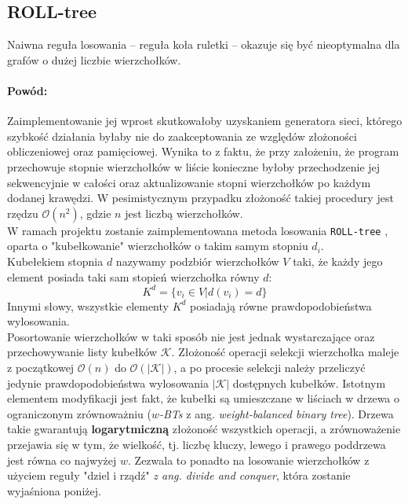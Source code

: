 \documentclass{article}
\begin{document}
	\subsection{ROLL-tree}
	Naiwna reguła losowania -- reguła koła ruletki -- okazuje się być nieoptymalna dla grafów o dużej liczbie wierzchołków.
	\paragraph{Powód:\\}
	Zaimplementowanie jej wprost skutkowałoby uzyskaniem generatora sieci, którego szybkość działania byłaby nie do zaakceptowania ze względów złożoności obliczeniowej oraz pamięciowej. Wynika to z faktu, że przy założeniu, że program przechowuje stopnie wierzchołków w liście konieczne byłoby przechodzenie jej sekwencyjnie w całości oraz aktualizowanie stopni wierzchołków po każdym dodanej krawędzi. W pesimistycznym przypadku złożoność takiej procedury jest rzędzu $\mathcal{O}(n^2)$, gdzie $n$ jest liczbą wierzchołków.\\
	\newline
	W ramach projektu zostanie zaimplementowana metoda losowania \texttt{ROLL-tree} \cite{rolltree}, oparta o "kubełkowanie" wierzchołków o takim samym stopniu $d_i$.\\ 
	Kubełekiem stopnia $d$ nazywamy podzbiór wierzchołków $V$ taki, że każdy jego element posiada taki sam stopień wierzchołka równy $d$:
	\begin{equation}
		K^{d} = \{v_i \in V | d(v_{i}) = d\}
	\end{equation}
	Innymi słowy, wszystkie elementy $K^{d}$ posiadają równe prawdopodobieństwa wylosowania. \\
	Posortowanie wierzchołków w taki sposób nie jest jednak wystarczające
	oraz przechowywanie listy kubełków $\mathcal{K}$. Złożoność operacji selekcji wierzchołka maleje z początkowej $\mathcal{O}(n)$ do $\mathcal{O}(|\mathcal{K}|)$, a po procesie selekcji należy przeliczyć jedynie prawdopodobieństwa wylosowania $|\mathcal{K}|$ dostępnych kubełków.
	Istotnym elementem modyfikacji jest fakt, że
	kubełki są umieszczane w liściach w drzewa o ograniczonym zrównoważniu (\textit{$w$-BTs} z ang. \textit{weight-balanced binary tree}). Drzewa takie gwarantują \textbf{logarytmiczną} złożoność wszystkich operacji, a zrównoważenie
	przejawia się w tym, że wielkość, tj. liczbę kluczy, lewego i prawego poddrzewa jest równa co najwyżej $w$.
	Zezwala to ponadto na losowanie wierzchołków z użyciem reguły "dziel i rządź" \textit{z ang. divide and conquer}, która zostanie wyjaśniona poniżej.\\
\end{document}
